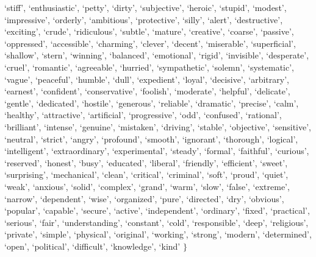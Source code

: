 `stiff', `enthusiastic', `petty', `dirty', `subjective', `heroic', `stupid', `modest', `impressive', `orderly', `ambitious', `protective', `silly', `alert', `destructive', `exciting', `crude', `ridiculous', `subtle', `mature', `creative', `coarse', `passive', `oppressed', `accessible', `charming', `clever', `decent', `miserable', `superficial', `shallow', `stern', `winning', `balanced', `emotional', `rigid', `invisible', `desperate', `cruel', `romantic', `agreeable', `hurried', `sympathetic', `solemn', `systematic', `vague', `peaceful', `humble', `dull', `expedient', `loyal', `decisive', `arbitrary', `earnest', `confident', `conservative', `foolish', `moderate', `helpful', `delicate', `gentle', `dedicated', `hostile', `generous', `reliable', `dramatic', `precise', `calm', `healthy', `attractive', `artificial', `progressive', `odd', `confused', `rational', `brilliant', `intense', `genuine', `mistaken', `driving', `stable', `objective', `sensitive', `neutral', `strict', `angry', `profound', `smooth', `ignorant', `thorough', `logical', `intelligent', `extraordinary', `experimental', `steady', `formal', `faithful', `curious', `reserved', `honest', `busy', `educated', `liberal', `friendly', `efficient', `sweet', `surprising', `mechanical', `clean', `critical', `criminal', `soft', `proud', `quiet', `weak', `anxious', `solid', `complex', `grand', `warm', `slow', `false', `extreme', `narrow', `dependent', `wise', `organized', `pure', `directed', `dry', `obvious', `popular', `capable', `secure', `active', `independent', `ordinary', `fixed', `practical', `serious', `fair', `understanding', `constant', `cold', `responsible', `deep', `religious', `private', `simple', `physical', `original', `working', `strong', `modern', `determined', `open', `political', `difficult', `knowledge', `kind' $\}$ \\

